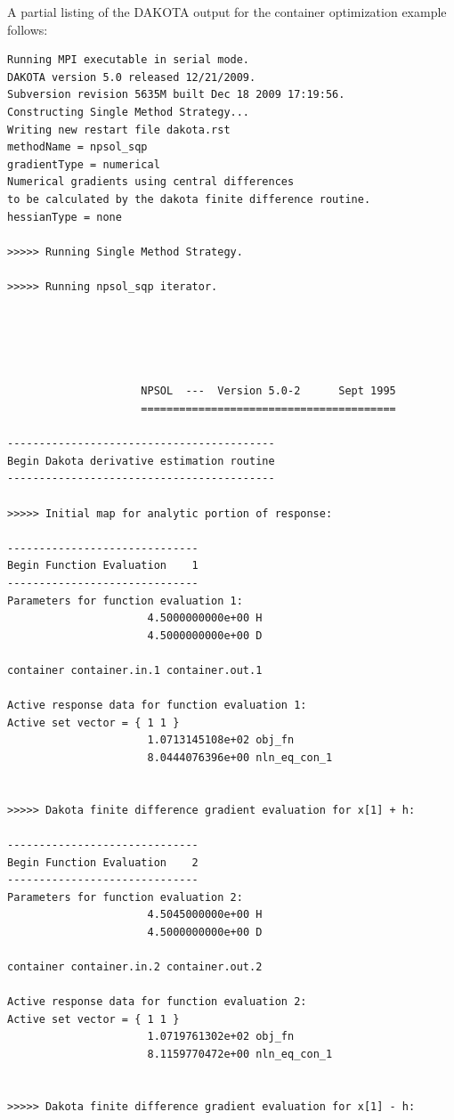 A partial listing of the DAKOTA output for the container optimization
example follows:
\begin{small}
\begin{verbatim}
Running MPI executable in serial mode.
DAKOTA version 5.0 released 12/21/2009.
Subversion revision 5635M built Dec 18 2009 17:19:56.
Constructing Single Method Strategy...
Writing new restart file dakota.rst
methodName = npsol_sqp
gradientType = numerical
Numerical gradients using central differences
to be calculated by the dakota finite difference routine.
hessianType = none

>>>>> Running Single Method Strategy.

>>>>> Running npsol_sqp iterator.





                     NPSOL  ---  Version 5.0-2      Sept 1995
                     ========================================

------------------------------------------
Begin Dakota derivative estimation routine
------------------------------------------

>>>>> Initial map for analytic portion of response:

------------------------------
Begin Function Evaluation    1
------------------------------
Parameters for function evaluation 1:
                      4.5000000000e+00 H
                      4.5000000000e+00 D

container container.in.1 container.out.1

Active response data for function evaluation 1:
Active set vector = { 1 1 }
                      1.0713145108e+02 obj_fn
                      8.0444076396e+00 nln_eq_con_1


>>>>> Dakota finite difference gradient evaluation for x[1] + h:

------------------------------
Begin Function Evaluation    2
------------------------------
Parameters for function evaluation 2:
                      4.5045000000e+00 H
                      4.5000000000e+00 D

container container.in.2 container.out.2

Active response data for function evaluation 2:
Active set vector = { 1 1 }
                      1.0719761302e+02 obj_fn
                      8.1159770472e+00 nln_eq_con_1


>>>>> Dakota finite difference gradient evaluation for x[1] - h:


\end{verbatim}
\end{small}
